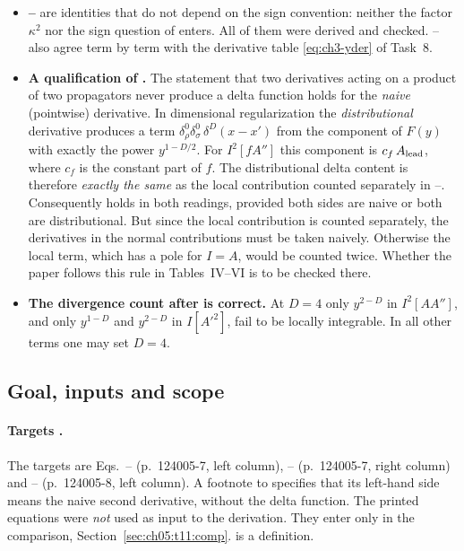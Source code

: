 \begin{resultbox}
\begin{itemize}[leftmargin=12pt,itemsep=2pt]
\item \textbf{--} are identities that do not depend on the sign convention: neither the factor $\kappa^2$ nor the sign question of  enters.
All of them were derived and checked. -- also agree term by term with the derivative table \eqref{eq:ch3-yder} of Task~8.
\item \textbf{A qualification of .} The statement that two derivatives acting on a product of two propagators never produce a delta function holds for the \emph{naive} (pointwise) derivative.
In dimensional regularization the \emph{distributional} derivative produces a term
$\delta^0_\rho\delta^0_\sigma\,\delta^D(x-x')$ from the component of $F(y)$ with exactly the power $y^{1-D/2}$.
For $I^2[fA'']$ this component is $c_f\,A_{\rm lead}$, where $c_f$ is the constant part of $f$.
The distributional delta content is therefore \emph{exactly the same} as the local contribution counted separately in --.
Consequently  holds in both readings, provided both sides are naive or both are distributional.
But since the local contribution is counted separately, the derivatives in the normal contributions must be taken naively.
Otherwise the local term, which has a pole for $I=A$, would be counted twice.
Whether the paper follows this rule in Tables~IV--VI is to be checked there.
\item \textbf{The divergence count after  is correct.} At $D=4$ only $y^{2-D}$ in $I^2[AA'']$, and only $y^{1-D}$ and $y^{2-D}$ in $I[A'^2]$, fail to be locally integrable.
In all other terms one may set $D=4$.
\end{itemize}
\end{resultbox}

\subsection{Goal, inputs and scope}

\paragraph{Targets \tP.}
The targets are Eqs.~-- (p.~124005-7, left column), -- (p.~124005-7, right column) and -- (p.~124005-8, left column).
A footnote to  specifies that its left-hand side means the naive second derivative, without the delta function.
The printed equations were \emph{not} used as input to the derivation. They enter only in the comparison, Section~\ref{sec:ch05:t11:comp}.
 is a definition.

